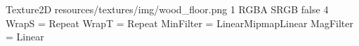 Texture2D
resources/textures/img/wood_floor.png
1
RGBA
SRGB
false
4
WrapS = Repeat
WrapT = Repeat
MinFilter = LinearMipmapLinear
MagFilter = Linear
